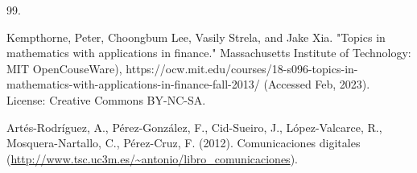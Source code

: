 \documentclass[graybox,envcountchap,sectrefs]{svmono_mod}
\begin{document}
\begin{thebibliography}{99.}

Kempthorne, Peter, Choongbum Lee, Vasily Strela, and Jake Xia. "Topics in mathematics with applications in finance." Massachusetts Institute of Technology: MIT OpenCouseWare), https://ocw.mit.edu/courses/18-s096-topics-in-mathematics-with-applications-in-finance-fall-2013/ (Accessed Feb, 2023). License: Creative Commons BY-NC-SA.

Artés-Rodríguez, A., Pérez-González, F., Cid-Sueiro, J., López-Valcarce, R., Mosquera-Nartallo, C., Pérez-Cruz, F. (2012). Comunicaciones digitales (\url{http://www.tsc.uc3m.es/~antonio/libro_comunicaciones}).

\end{thebibliography}


\backmatter
\printindex
\end{document}
